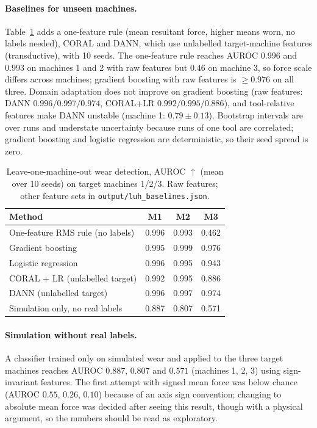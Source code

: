 \documentclass[11pt]{article}
\newcommand{\best}[1]{\cellcolor{gray!18}#1}
\begin{document}
\paragraph{Baselines for unseen machines.} Table~\ref{tab:luhbase} adds a one-feature rule (mean resultant force, higher means worn, no labels needed), CORAL and DANN, which use unlabelled target-machine features (transductive), with 10 seeds. The one-feature rule reaches AUROC $0.996$ and $0.993$ on machines 1 and 2 with raw features but $0.46$ on machine 3, so force scale differs across machines; gradient boosting with raw features is $\ge0.976$ on all three. Domain adaptation does not improve on gradient boosting (raw features: DANN $0.996/0.997/0.974$, CORAL+LR $0.992/0.995/0.886$), and tool-relative features make DANN unstable (machine 1: $0.79\pm0.13$). Bootstrap intervals are over runs and understate uncertainty because runs of one tool are correlated; gradient boosting and logistic regression are deterministic, so their seed spread is zero.
\begin{table}[t]\centering\small
\caption{Leave-one-machine-out wear detection, AUROC $\uparrow$ (mean over 10 seeds) on target machines 1/2/3. Raw features; other feature sets in \texttt{output/luh\_baselines.json}.}\label{tab:luhbase}
\begin{tabular}{lccc}\toprule
Method & M1 & M2 & M3\\\midrule
One-feature RMS rule (no labels) & 0.996 & 0.993 & 0.462\\
Gradient boosting & 0.995 & \best{0.999} & \best{0.976}\\
Logistic regression & 0.996 & 0.995 & 0.943\\
CORAL + LR (unlabelled target) & 0.992 & 0.995 & 0.886\\
DANN (unlabelled target) & \best{0.996} & 0.997 & 0.974\\
Simulation only, no real labels & 0.887 & 0.807 & 0.571\\\bottomrule
\end{tabular}
\end{table}
\paragraph{Simulation without real labels.} A classifier trained only on simulated wear and applied to the three target machines reaches AUROC $0.887$, $0.807$ and $0.571$ (machines 1, 2, 3) using sign-invariant features. The first attempt with signed mean force was below chance (AUROC $0.55$, $0.26$, $0.10$) because of an axis sign convention; changing to absolute mean force was decided after seeing this result, though with a physical argument, so the numbers should be read as exploratory.
\end{document}
